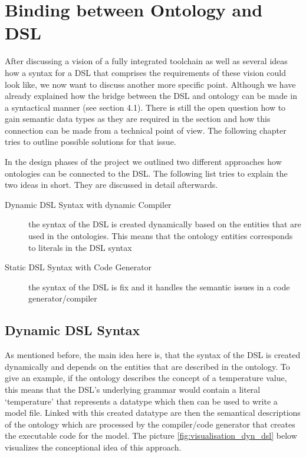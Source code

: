 \section{Binding between Ontology and DSL}
\par
After discussing a vision of a fully integrated toolchain as well as several ideas how a syntax for a DSL that comprises the requirements of  these vision could look like, we now want to discuss another more specific point. Although we have already explained how the bridge between the DSL and ontology can be made in a syntactical manner 
(see section 4.1). There is still the open question how to gain semantic data types as they are required in the section  and how this connection can be made from a technical point of view. The following chapter tries to outline possible solutions for that issue.
\par
In the design phases of the project we outlined two different approaches how ontologies can be connected to the DSL. The following list tries to explain the two ideas in short. They are discussed in detail afterwards.
\begin{description}
	\item[Dynamic DSL Syntax with dynamic Compiler] the syntax of the DSL is created dynamically based on the entities that are used in the ontologies. This means that the ontology entities corresponds to  literals in the DSL syntax
	\item[Static DSL Syntax with Code Generator] the syntax of the DSL is fix and it handles the semantic issues in a code generator/compiler
\end{description}

\subsection{Dynamic DSL Syntax}
\par
As mentioned before, the main idea here is, that the syntax of the DSL is created dynamically and depends on the entities that are described in the ontology. To give an example, if the ontology describes the concept of a temperature value, this means that the DSL’s underlying grammar would contain a literal ‘temperature’ that  represents a datatype which then can be used to write a model file. Linked with this created datatype are then the semantical descriptions of the ontology which are processed by the compiler/code generator that creates the executable code for the model. The picture \ref{fig:visualisation_dyn_dsl} below visualizes the conceptional idea of this approach.

